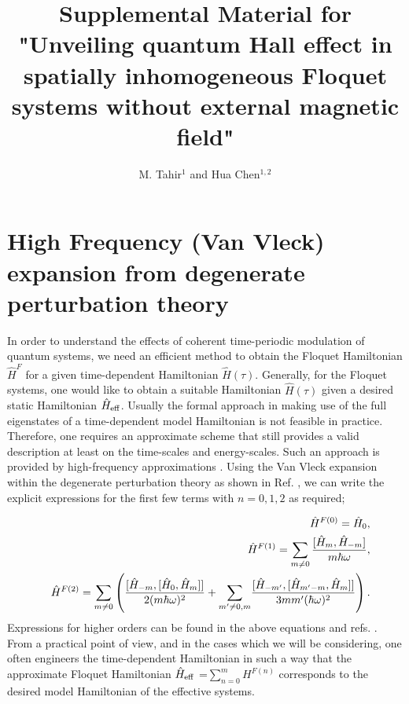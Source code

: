 \documentclass[aps,pra,preprint,showpacs]{revtex4-1}
\begin{document}
\title{Supplemental Material for "Unveiling quantum Hall effect in spatially inhomogeneous Floquet systems without external magnetic field"}
\author{M. Tahir$^{1}$ and Hua Chen$^{1,2}$}


\maketitle

\section{High Frequency (Van Vleck) expansion from degenerate perturbation theory}

In order to understand the effects of coherent time-periodic modulation of quantum systems, we need an efficient method to obtain the Floquet
Hamiltonian $\hat{H}^{F}$ for a given time-dependent Hamiltonian $\hat{H} (\tau )$. Generally, for the Floquet systems, one would like to obtain a
suitable Hamiltonian $\hat{H}(\tau )$ given a desired static Hamiltonian $\hat{H}_{\rm eff}$. Usually the formal approach in making use of the
full eigenstates of a time-dependent model Hamiltonian is not feasible in practice. Therefore, one requires an approximate scheme that still provides
a valid description at least on the time-scales and energy-scales. Such an approach is provided by high-frequency approximations \cite{JHS,HSA,MGP,MBL,AEE,NGJ}. 
Using the Van Vleck expansion within the degenerate perturbation theory as shown in Ref. \cite{AEE}, we can write the explicit expressions for the first few terms with $n=0,1,2$ as required;

\begin{eqnarray} \label{eq:44}
&&\hat{H}^{F(0)}=\hat{H}_{0},  \\
&&\hat{H}^{F(1)} =\sum_{m\neq 0}\frac{[\hat{H}_{m},\hat{H}_{-m}]}{m\hbar \omega } 
\notag,\\
&&\hat{H}^{F(2)}={\displaystyle\sum_{m\neq0}}
\left(  \frac{[\hat{H}_{-m},[\hat{H}_{0},\hat{H}_{m}]]}{2(m\hbar\omega)^{2}
}+{\displaystyle\sum_{m^{\prime}\neq0,m}}
\frac{[\hat{H}_{-m^{\prime}},[\hat{H}_{m^{\prime}-m},\hat{H}_{m}
]]}{3mm^{\prime}(\hbar\omega)^{2}}\right)\notag.
\end{eqnarray}
Expressions for higher orders can be found in the above equations and refs. \cite{JHS,HSA,MGP,MBL,AEE,NGJ}. From a practical
point of view, and in the cases which we will be considering, one often engineers the time-dependent Hamiltonian in such a way that the approximate
Floquet Hamiltonian $\hat{H}_{\rm eff}$ =$\sum_{n=0}^{m}H^{F(n)}$ corresponds to the desired model Hamiltonian of the effective systems.
\end{document}
